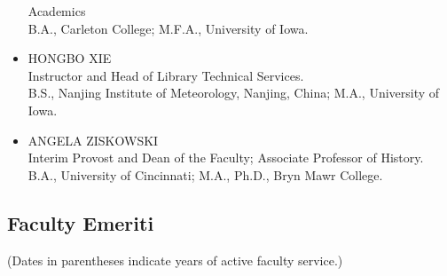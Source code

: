 \documentclass[
  letterpaper,
]{scrbook}
\begin{document}
\begin{itemize}
  Academics\\
  B.A., Carleton College; M.F.A., University of Iowa.
\item
  HONGBO XIE\\
  Instructor and Head of Library Technical Services.\\
  B.S., Nanjing Institute of Meteorology, Nanjing, China; M.A.,
  University of Iowa.
\item
  ANGELA ZISKOWSKI\\
  Interim Provost and Dean of the Faculty; Associate Professor of
  History.\\
  B.A., University of Cincinnati; M.A., Ph.D., Bryn Mawr College.
\end{itemize}

\hypertarget{faculty-emeriti}{%
\subsection{Faculty Emeriti}\label{faculty-emeriti}}

(Dates in parentheses indicate years of active faculty service.)
\end{document}
